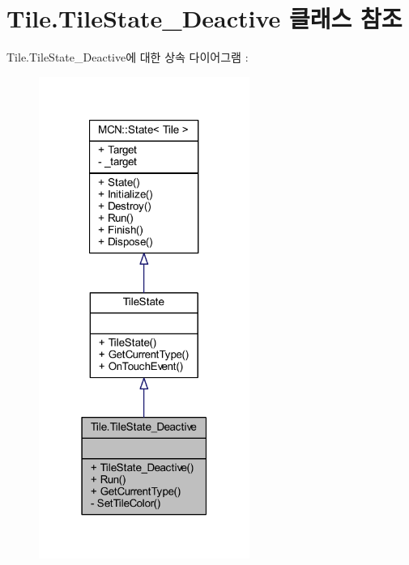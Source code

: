 \hypertarget{class_tile_1_1_tile_state___deactive}{}\section{Tile.\+Tile\+State\+\_\+\+Deactive 클래스 참조}
\label{class_tile_1_1_tile_state___deactive}


Tile.\+Tile\+State\+\_\+\+Deactive에 대한 상속 다이어그램 \+: \nopagebreak
\begin{figure}[H]
\begin{center}
\leavevmode
\includegraphics[width=195pt]{class_tile_1_1_tile_state___deactive__inherit__graph}
\end{center}
\end{figure}


